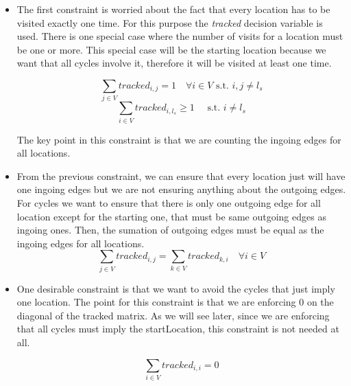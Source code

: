 \documentclass[]{report}
\begin{document}
\begin{itemize}
	\item The first constraint is worried about the fact that every location has to be visited exactly one time. For this purpose the \textit{tracked} decision variable is used. There is one special case where the number of visits for a location must be one or more. This special case will be the starting location because we want that all cycles involve it, therefore it will be visited at least one time.

	$$\sum\limits_{j \in V} tracked_{i,j} = 1 \quad \forall i \in V \text{ s.t. } i,j \neq l_{s}$$
	$$\sum\limits_{i \in V} tracked_{i,l_{s}} \geq 1 \quad \text{ s.t. } i \neq l_{s}$$
	
	The key point in this constraint is that we are counting the ingoing edges for all locations. 
	
	
	\item From the previous constraint, we can ensure that every location just will have one ingoing edges but we are not ensuring anything about the outgoing edges. For cycles we want to ensure that there is only one outgoing edge for all location except for the starting one, that must be same outgoing edges as ingoing ones. Then, the sumation of outgoing edges must be equal as the ingoing edges for all locations.
	$$\sum\limits_{j \in V} tracked_{i,j} = \sum\limits_{k \in V} tracked_{k,i} \quad \forall i \in V $$
	$$ $$

	
	\item One desirable constraint is that we want to avoid the cycles that just imply one location. The point for this constraint is that we are enforcing 0 on the diagonal of the tracked matrix. As we will see later, since we are enforcing that all cycles must imply the startLocation, this constraint is not needed at all.

	$$ \sum\limits_{i \in V} tracked_{i,i} = 0 $$
	$$ $$

\end{itemize}
\end{document}
